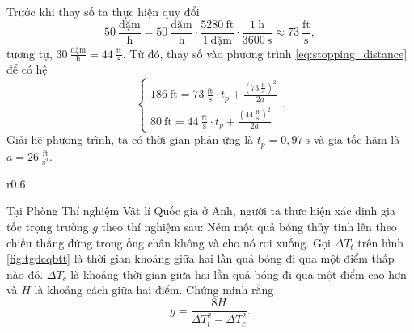\documentclass[a4paper, titlepage, openany]{book}
\newcounter{exercise}
\begin{document}
Trước khi thay số ta thực hiện quy đổi $$50\ \frac{\text{dặm}}{\text{h}}=50\ \frac{\text{dặm}}{\text{h}}\cdot\frac{5280\ \text{ft}}{1\ \text{dặm}}\cdot\frac{1\ \text{h}}{3600\ \text{s}}\approx 73\ \frac{\text{ft}}{\text{s}},$$ tương tự, $30\ \frac{\text{dặm}}{\text{h}}=44\ \frac{\text{ft}}{\text{s}}$. Từ đó, thay số vào phương trình \ref{eq:stopping_distance} để có hệ
\begin{equation*}
   \begin{cases}
      186\ \text{ft} = 73\ \frac{\text{ft}}{\text{s}}\cdot t_p + \frac{\left(73\ \frac{\text{ft}}{\text{s}}\right)^2}{2a} \\
      80\ \text{ft} = 44\ \frac{\text{ft}}{\text{s}}\cdot t_p + \frac{\left(44\ \frac{\text{ft}}{\text{s}}\right)^2}{2a} 
   \end{cases}.
\end{equation*}
Giải hệ phương trình, ta có thời gian phản ứng là $t_p=\boxed{0{,}97\ \text{s}}$ và gia tốc hãm là $a = \boxed{26\ \frac{\text{ft}}{\text{s}^2}}$.

\begin{wrapfigure}{r}{0.6\textwidth} %
    \centering

   \caption{Đồ thị thời gian - độ cao của quả bóng thủy tinh}
   \label{fig:tgdcqbtt}
\end{wrapfigure}

\exercise Tại Phòng Thí nghiệm Vật lí Quốc gia ở Anh, người ta thực hiện xác định gia tốc trọng trường $g$ theo thí nghiệm sau: Ném một quả bóng thủy tinh lên theo chiều thẳng đứng trong ống chân không và cho nó rơi xuống. Gọi $\Delta T_t$ trên hình \ref{fig:tgdcqbtt} là thời gian khoảng giữa hai lần quả bóng đi qua một điểm thấp nào đó. $\Delta T_c$ là khoảng thời gian giữa hai lần quả bóng đi qua một điểm cao hơn và $H$ là khoảng cách giữa hai điểm. Chứng minh rằng $$g=\frac{8H}{\Delta T_t^2 - \Delta T_c^2}.$$
\end{document}
